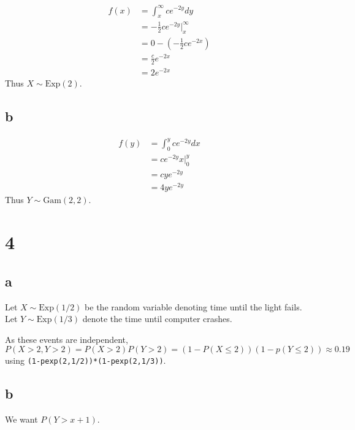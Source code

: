 \documentclass[10pt]{article}
\begin{document}
\begin{align*}
    f(x) &= \int_x^\infty ce^{-2y}dy\\
    &= -\frac{1}{2}ce^{-2y} \Bigr |_x^\infty\\
    &= 0 - (-\frac{1}{2}ce^{-2x})\\
    &= \frac{c}{2}e^{-2x}\\
    &= 2e^{-2x}
\end{align*}
Thus $X\sim\text{Exp}(2).$
\subsection*{b}
\begin{align*}
    f(y) &= \int_0^y ce^{-2y}dx\\
    &= ce^{-2y}x \Bigr |_0^y\\
    &= cye^{-2y}\\
    &= 4ye^{-2y}
\end{align*}
Thus $Y\sim\text{Gam}(2,2).$

\section*{4}
\subsection*{a}
Let $X\sim\text{Exp}(1/2)$ be the random variable denoting time until the light fails. Let $Y\sim\text{Exp}(1/3)$ denote the time until computer crashes.


As these events are independent, $P(X>2,Y>2)=P(X>2)P(Y>2) = (1-P(X\le2))(1-p(Y\le2))\approx0.19$ using \texttt{(1-pexp(2,1/2))*(1-pexp(2,1/3))}.

\subsection*{b}
We want $P(Y>x+1).$
\end{document}
